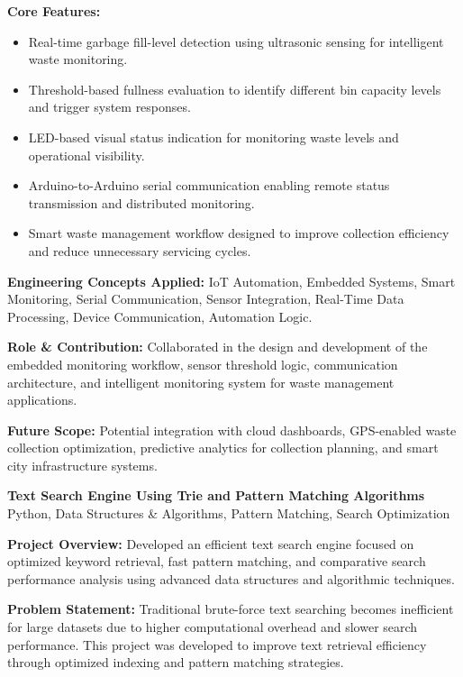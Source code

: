 \documentclass[a4paper,11pt]{article}
\newcommand{\resumeProject}[2]{
\textbf{#1} \hfill {\small #2}
}
\begin{document}
\textbf{Core Features:}
\begin{itemize}

    \item Real-time garbage fill-level detection using ultrasonic sensing for intelligent waste monitoring.

    \item Threshold-based fullness evaluation to identify different bin capacity levels and trigger system responses.

    \item LED-based visual status indication for monitoring waste levels and operational visibility.

    \item Arduino-to-Arduino serial communication enabling remote status transmission and distributed monitoring.

    \item Smart waste management workflow designed to improve collection efficiency and reduce unnecessary servicing cycles.

\end{itemize}

\textbf{Engineering Concepts Applied:}
IoT Automation, Embedded Systems, Smart Monitoring, Serial Communication, Sensor Integration, Real-Time Data Processing, Device Communication, Automation Logic.

\textbf{Role \& Contribution:}
Collaborated in the design and development of the embedded monitoring workflow, sensor threshold logic, communication architecture, and intelligent monitoring system for waste management applications.

\textbf{Future Scope:}
Potential integration with cloud dashboards, GPS-enabled waste collection optimization, predictive analytics for collection planning, and smart city infrastructure systems.


\resumeProject
{Text Search Engine Using Trie and Pattern Matching Algorithms}
{Python, Data Structures \& Algorithms, Pattern Matching, Search Optimization}

\textbf{Project Overview:}
Developed an efficient text search engine focused on optimized keyword retrieval, fast pattern matching, and comparative search performance analysis using advanced data structures and algorithmic techniques.

\textbf{Problem Statement:}
Traditional brute-force text searching becomes inefficient for large datasets due to higher computational overhead and slower search performance. This project was developed to improve text retrieval efficiency through optimized indexing and pattern matching strategies.
\end{document}
